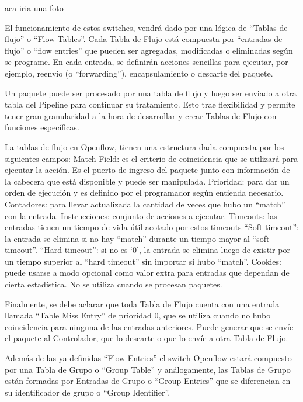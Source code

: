 \documentclass[12pt,a4paper,oneside]{book}
\begin{document}
aca iria una foto


El funcionamiento de estos switches, vendrá dado por una lógica de “Tablas de flujo” o “Flow Tables”. Cada Tabla de Flujo está compuesta por “entradas de flujo” o “flow entries” que pueden ser agregadas, modificadas o eliminadas según se programe. En cada entrada, se definirán acciones sencillas para ejecutar, por ejemplo, reenvío (o “forwarding”), encapsulamiento o descarte del paquete.

Un paquete puede ser procesado por una tabla de flujo y luego ser enviado a otra tabla del Pipeline para continuar su tratamiento. Esto trae flexibilidad y permite tener gran granularidad a la hora de desarrollar y crear Tablas de Flujo con funciones específicas.

La tablas de flujo en Openflow, tienen una estructura dada compuesta por los siguientes campos:
Match Field: es el criterio de coincidencia que se utilizará para ejecutar la acción. Es el puerto de ingreso del paquete junto con información de la cabecera que está disponible y puede ser manipulada.
Prioridad: para dar un orden de ejecución y es definido por el programador según entienda necesario.
Contadores: para llevar actualizada la cantidad de veces que hubo un “match” con la entrada.
Instrucciones: conjunto de acciones a ejecutar. 
Timeouts: las entradas tienen un tiempo de vida útil acotado por estos timeouts
“Soft timeout”: la entrada se elimina si no hay “match” durante un tiempo mayor al “soft timeout”.
“Hard timeout”: si no es ‘0’, la entrada se elimina luego de existir por un tiempo superior al “hard timeout” sin importar si hubo “match”.
Cookies: puede usarse a modo opcional como valor extra para entradas que dependan de cierta estadística. No se utiliza cuando se procesan paquetes.
	
	Finalmente, se debe aclarar que toda Tabla de Flujo cuenta con una entrada llamada “Table Miss Entry” de prioridad 0, que se utiliza cuando no hubo coincidencia para ninguna de las entradas anteriores. Puede generar que se envíe el paquete al Controlador, que lo descarte o que lo envíe a otra Tabla de Flujo.

	Además de las ya definidas “Flow Entries” el switch Openflow estará compuesto por una Tabla de Grupo o “Group Table” y análogamente, las Tablas de Grupo están formadas por Entradas de Grupo o “Group Entries” que se diferencian en su identificador de grupo o “Group Identifier”.
	
\end{document}
